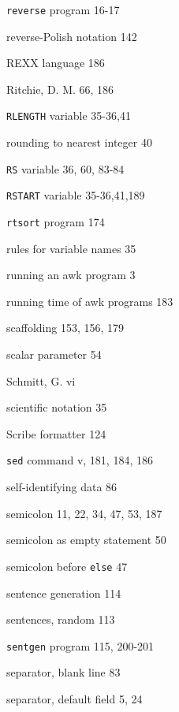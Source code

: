 \begin{multicols}{3}
\hangindent=3pc  \verb'reverse' program 16-17

\hangindent=3pc  reverse-Polish notation 142

\hangindent=3pc  REXX language 186

\hangindent=3pc  Ritchie, D. M. 66, 186

\hangindent=3pc  \verb'RLENGTH' variable 35-36,41

\hangindent=3pc  rounding to nearest integer 40

\hangindent=3pc  \verb'RS' variable 36, 60, 83-84

\hangindent=3pc  \verb'RSTART' variable 35-36,41,189

\hangindent=3pc  \verb'rtsort' program 174

\hangindent=3pc  rules for variable names 35

\hangindent=3pc  running an awk program 3

\hangindent=3pc  running time of awk programs 183

\hangindent=3pc  scaffolding 153, 156, 179

\hangindent=3pc  scalar parameter 54

\hangindent=3pc  Schmitt, G. vi

\hangindent=3pc  scientific notation 35

\hangindent=3pc  Scribe formatter 124

\hangindent=3pc  \verb'sed' command v, 181, 184, 186

\hangindent=3pc  self-identifying data 86

\hangindent=3pc  semicolon 11, 22, 34, 47, 53, 187

\hangindent=3pc  semicolon as empty statement 50

\hangindent=3pc  semicolon before \verb'else' 47

\hangindent=3pc  sentence generation 114

\hangindent=3pc  sentences, random 113

\hangindent=3pc  \verb'sentgen' program 115, 200-201

\hangindent=3pc  separator, blank line 83

\hangindent=3pc  separator, default field 5, 24


\end{multicols}
